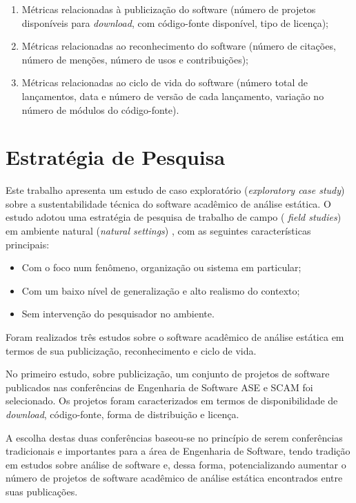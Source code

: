 \begin{enumerate}
  \item Métricas relacionadas à publicização do software (número de projetos
  disponíveis para {\it download}, com código-fonte disponível, tipo de licença);

  \item Métricas relacionadas ao reconhecimento do software (número de
  citações, número de menções, número de usos e contribuições);

  \item Métricas relacionadas ao ciclo de vida do software (número total de
  lançamentos, data e número de versão de cada lançamento, variação no número
  de módulos do código-fonte).
\end{enumerate}

\section{Estratégia de Pesquisa}

Este trabalho apresenta um estudo de caso exploratório ({\it exploratory case
study}) sobre a sustentabilidade técnica do software acadêmico de análise
estática. O estudo adotou uma estratégia de pesquisa de trabalho de campo ({\it
field studies}) em ambiente natural ({\it natural settings})
\cite{stol2015holistic}, com as seguintes características principais:

\begin{itemize}
  \item Com o foco num fenômeno, organização ou sistema em particular;
  \item Com um baixo nível de generalização e alto realismo do contexto;
  \item Sem intervenção do pesquisador no ambiente.
\end{itemize}

Foram realizados três estudos sobre o software acadêmico de análise estática em
termos de sua publicização, reconhecimento e ciclo de vida.

No primeiro estudo, sobre publicização, um conjunto de projetos de software
publicados nas conferências de Engenharia de Software ASE e SCAM foi
selecionado. Os projetos foram caracterizados em termos de disponibilidade de
{\it download}, código-fonte, forma de distribuição e licença.

A escolha destas duas conferências baseou-se no princípio de serem conferências
tradicionais e importantes para a área de Engenharia de Software, tendo
tradição em estudos sobre análise de software e, dessa forma, potencializando
aumentar o número de projetos de software acadêmico de análise estática
encontrados entre suas publicações.

